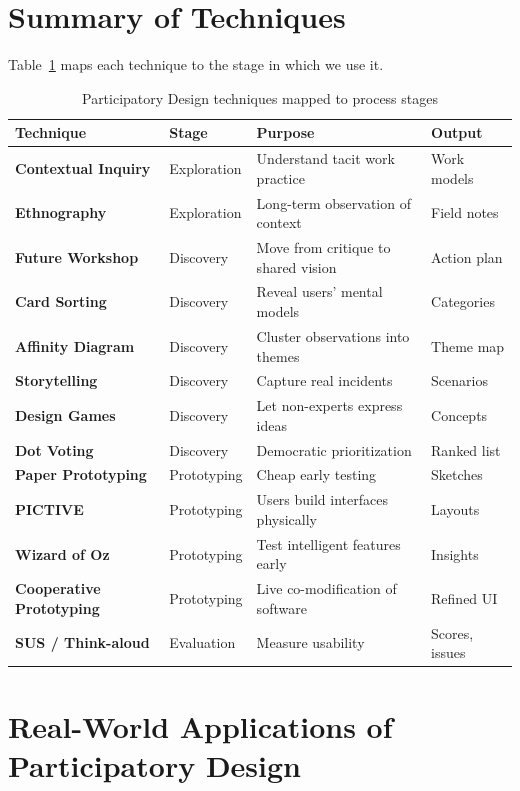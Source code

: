 \documentclass[a4paper,12pt]{article}
\begin{document}
\section{Summary of Techniques}
Table~\ref{tab:techniques} maps each technique to the stage in which we use it.
\begin{table}[H]
\centering
\small
\begin{tabularx}{\textwidth}{@{}>{\bfseries}l l X l@{}}
\toprule
\rowcolor{myblue!20} Technique & Stage & Purpose & Output \\
\midrule
Contextual Inquiry   & Exploration & Understand tacit work practice & Work models \\
Ethnography          & Exploration & Long-term observation of context & Field notes \\
Future Workshop      & Discovery   & Move from critique to shared vision & Action plan \\
Card Sorting         & Discovery   & Reveal users' mental models & Categories \\
Affinity Diagram     & Discovery   & Cluster observations into themes & Theme map \\
Storytelling         & Discovery   & Capture real incidents & Scenarios \\
Design Games         & Discovery   & Let non-experts express ideas & Concepts \\
Dot Voting   & Discovery   & Democratic prioritization & Ranked list \\
Paper Prototyping    & Prototyping & Cheap early testing & Sketches \\
PICTIVE              & Prototyping & Users build interfaces physically & Layouts \\
Wizard of Oz         & Prototyping & Test intelligent features early & Insights \\
Cooperative Prototyping & Prototyping & Live co-modification of software & Refined UI \\
SUS / Think-aloud    & Evaluation  & Measure usability & Scores, issues \\
\bottomrule
\end{tabularx}
\caption{Participatory Design techniques mapped to process stages}
\label{tab:techniques}
\end{table}


\section{Real-World Applications of Participatory Design}
\label{sec:applications}
\end{document}
